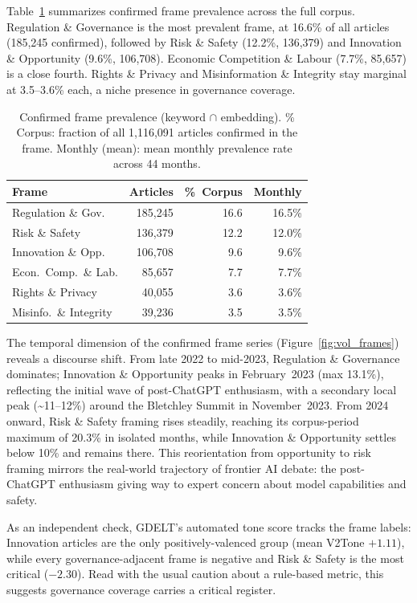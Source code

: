 \documentclass[sigconf]{acmart}
\begin{document}
Table~\ref{tab:frame_stats} summarizes confirmed frame prevalence across the full corpus.
Regulation \& Governance is the most prevalent frame, at 16.6\% of all articles (185,245 confirmed), followed by Risk \& Safety (12.2\%, 136,379) and Innovation \& Opportunity (9.6\%, 106,708).
Economic Competition \& Labour (7.7\%, 85,657) is a close fourth. Rights \& Privacy and Misinformation \& Integrity stay marginal at 3.5--3.6\% each, a niche presence in governance coverage.

\begin{table}[!t]
\caption{Confirmed frame prevalence (keyword $\cap$ embedding). \% Corpus: fraction of all 1,116,091 articles confirmed in the frame. Monthly (mean): mean monthly prevalence rate across 44 months.}
\label{tab:frame_stats}
\footnotesize
\setlength{\tabcolsep}{3pt}
\begin{tabular}{lrrr}
\toprule
\textbf{Frame} & \textbf{Articles} & \textbf{\%~Corpus} & \textbf{Monthly} \\
\midrule
Regulation \& Gov.     & 185,245 & 16.6 & 16.5\% \\
Risk \& Safety         & 136,379 & 12.2 & 12.0\% \\
Innovation \& Opp.     & 106,708 &  9.6 &  9.6\% \\
Econ.\ Comp.\ \& Lab.  &  85,657 &  7.7 &  7.7\% \\
Rights \& Privacy      &  40,055 &  3.6 &  3.6\% \\
Misinfo.\ \& Integrity &  39,236 &  3.5 &  3.5\% \\
\bottomrule
\end{tabular}
\end{table}

The temporal dimension of the confirmed frame series (Figure~\ref{fig:vol_frames}) reveals a discourse shift.
From late 2022 to mid-2023, Regulation \& Governance dominates; Innovation \& Opportunity peaks in February~2023 (max 13.1\%), reflecting the initial wave of post-ChatGPT enthusiasm, with a secondary local peak (\textasciitilde11--12\%) around the Bletchley Summit in November~2023.
From 2024 onward, Risk \& Safety framing rises steadily, reaching its corpus-period maximum of 20.3\% in isolated months, while Innovation \& Opportunity settles below 10\% and remains there.
This reorientation from opportunity to risk framing mirrors the real-world trajectory of frontier AI debate: the post-ChatGPT enthusiasm giving way to expert concern about model capabilities and safety.

As an independent check, GDELT's automated tone score tracks the frame labels: Innovation articles are the only positively-valenced group (mean V2Tone $+1.11$), while every governance-adjacent frame is negative and Risk \& Safety is the most critical ($-2.30$). Read with the usual caution about a rule-based metric, this suggests governance coverage carries a critical register.
\end{document}
